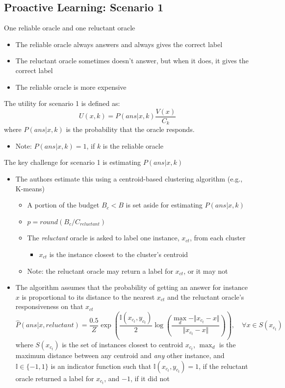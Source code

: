 \documentclass[10pt]{article}
\begin{document}
\subsection*{Proactive Learning: Scenario 1}
One reliable oracle and one reluctant oracle
\begin{itemize}
	\item The reliable oracle always answers and always gives the correct label
	\item The reluctant oracle sometimes doesn't answer, but when it does, it gives the correct label
	\item The reliable oracle is more expensive
\end{itemize}
The utility for scenario 1 is defined as:
\[U(x, k) = P(ans | x, k) \frac{V(x)}{C_k}\]
where $P(ans | x, k)$ is the probability that the oracle responds.
\begin{itemize}
	\item Note: $P(ans | x, k) = 1$, if $k$ is the reliable oracle
\end{itemize}
The key challenge for scenario 1 is estimating $P(ans | x, k)$
\begin{itemize}
	\item The authors estimate this using a centroid-based clustering algorithm (e.g., K-means)
	\begin{itemize}
	    \item A portion of the budget $B_c < B$ is set aside for estimating $P(ans | x, k)$
	    \item $p = round(B_c / C_{reluctant})$
	    \item The \textit{reluctant} oracle is asked to label one instance, $x_{ct}$, from each cluster
	    \begin{itemize}
	        \item $x_{ct}$ is the instance closest to the cluster's centroid
        \end{itemize}
        \item Note: the reluctant oracle may return a label for $x_{ct}$, or it may not
    \end{itemize}
    \item The algorithm assumes that the probability of getting an answer for instance $x$ is proportional to its distance to the nearest $x_{ct}$ and the reluctant oracle's responsiveness on that $x_{ct}$
    \[\hat{P}(ans | x, reluctant) = \frac{0.5}{Z} \exp \left(\frac{\mathbb{I}(x_{c_t}, y_{c_t})}{2} \log \left(\frac{\max_d - \Vert x_{c_t} - x\Vert}{\Vert x_{c_t} - x\Vert}\right)\right), \quad \forall x \in S(x_{c_t})\]
    where $S(x_{c_t})$ is the set of instances closest to centroid $x_{c_t}$, $\max_d$ is the maximum distance between any centroid and \textit{any} other instance, and $\mathbb{I} \in \{-1, 1\}$ is an indicator function such that $\mathbb{I}(x_{c_t}, y_{c_t}) = 1$, if the reluctant oracle returned a label for $x_{c_t}$, and $-1$, if it did not
\end{itemize}
\end{document}
